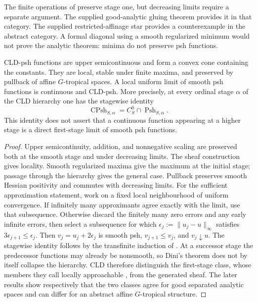The finite operations of  preserve
stage one, but decreasing limits require a separate argument.  The supplied
good-analytic gluing theorem provides it in that category.  The supplied
restricted-affinage star provides a counterexample in the abstract
category.  A formal diagonal using a smooth regularized minimum would not
prove the analytic theorem: minima do not preserve psh functions.

\begin{proposition}\label{prop:cld-psh-calculus}
CLD-psh functions are upper semicontinuous and form a convex cone containing
the constants.  They are local, stable under finite maxima, and preserved by
pullback of affine $G$-tropical spaces.  A local uniform limit of smooth psh
functions is continuous and CLD-psh.  More precisely, at every ordinal stage
$\alpha$ of the CLD hierarchy one has the stagewise identity
\[
       \operatorname{CPsh}_{S,\alpha}
       =C^0_S\cap\operatorname{Psh}_{S,\alpha}.
\]
This identity does not assert that a continuous function appearing at a
higher stage is a direct first-stage limit of smooth psh functions.
\end{proposition}
\begin{proof}
Upper semicontinuity, addition, and nonnegative scaling are preserved both
at the smooth stage and under decreasing limits.  The sheaf construction
gives locality.  Smooth regularized maxima give the maximum at the initial
stage; passage through the hierarchy gives the general case.  Pullback
preserves smooth Hessian positivity and commutes with decreasing limits.
For the sufficient approximation statement, work on a fixed local
neighbourhood of uniform convergence.  If infinitely many approximants
agree exactly with the limit, use that subsequence.  Otherwise discard the
finitely many zero errors and any early infinite errors, then select a
subsequence for which
$\epsilon_j:=\|u_j-u\|_\infty$ satisfies
$3\epsilon_{j+1}\leq\epsilon_j$.  Then
$v_j=u_j+2\epsilon_j$ is smooth psh,
$v_{j+1}\leq v_j$, and $v_j\downarrow u$.  The stagewise identity follows by
the transfinite induction of \cite[\S8.1]{CLD25}.  At a successor stage the
predecessor functions may already be nonsmooth, so Dini's theorem does not
by itself collapse the hierarchy.  CLD therefore distinguish the first-stage
class, whose members they call locally approachable
\cite[Definition~8.1.13]{CLD25}, from the generated sheaf.  The later results
 show respectively that the two classes
agree for good separated analytic spaces and can differ for an abstract
affine $G$-tropical structure.
\end{proof}

